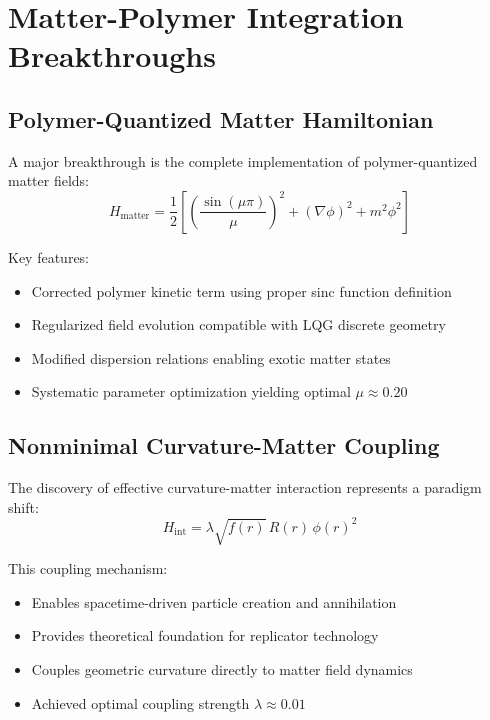 \documentclass[11pt]{article}
\begin{document}
\section{Matter-Polymer Integration Breakthroughs}

\subsection{Polymer-Quantized Matter Hamiltonian}

A major breakthrough is the complete implementation of polymer-quantized matter fields:
\begin{equation}
H_{\text{matter}} = \frac{1}{2}\left[\left(\frac{\sin(\mu\pi)}{\mu}\right)^2 + (\nabla\phi)^2 + m^2\phi^2\right]
\end{equation}

Key features:
\begin{itemize}
\item Corrected polymer kinetic term using proper sinc function definition
\item Regularized field evolution compatible with LQG discrete geometry
\item Modified dispersion relations enabling exotic matter states
\item Systematic parameter optimization yielding optimal $\mu \approx 0.20$
\end{itemize}

\subsection{Nonminimal Curvature-Matter Coupling}

The discovery of effective curvature-matter interaction represents a paradigm shift:
\begin{equation}
H_{\text{int}} = \lambda\sqrt{f(r)}\,R(r)\,\phi(r)^2
\end{equation}

This coupling mechanism:
\begin{itemize}
\item Enables spacetime-driven particle creation and annihilation
\item Provides theoretical foundation for replicator technology
\item Couples geometric curvature directly to matter field dynamics
\item Achieved optimal coupling strength $\lambda \approx 0.01$
\end{itemize}
\end{document}
